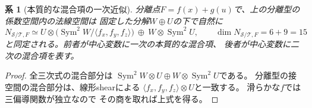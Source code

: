 \documentclass[11pt,a4paper]{ltjsarticle}
\numberwithin{equation}{section}
\newtheorem{corollary}[theorem]{系}
\newcommand{\Sym}{\operatorname{Sym}}
\begin{document}
\begin{corollary}[本質的な混合項の一次近似]
\label{cor:split-normal-directions}
分離点$F=f(x)+g(u)$で、上の分離型の係数空間内の法線空間は
固定した分解$W\oplus U$の下で自然に
\[
 N_{\mathcal S/\mathcal T,F}
 \simeq U\otimes\bigl(\Sym^2W/\langle f_x,f_y,f_z\rangle\bigr)
 \ \oplus\ W\otimes\Sym^2U,
 \qquad \dim N_{\mathcal S/\mathcal T,F}=6+9=15
 \tag{N}\label{eq:split-normal-directions}
\]
と同定される。前者が中心変数に一次の本質的な混合項、
後者が中心変数に二次の混合項を表す。
\end{corollary}
\begin{proof}
全三次式の混合部分は
$\Sym^2W\otimes U\oplus W\otimes\Sym^2U$である。
分離型の接空間の混合部分は、線形shearによる
$\langle f_x,f_y,f_z\rangle\otimes U$と一致する。
滑らかな$f$では三偏導関数が独立なので
その商を取れば上式を得る。
\end{proof}
\end{document}
